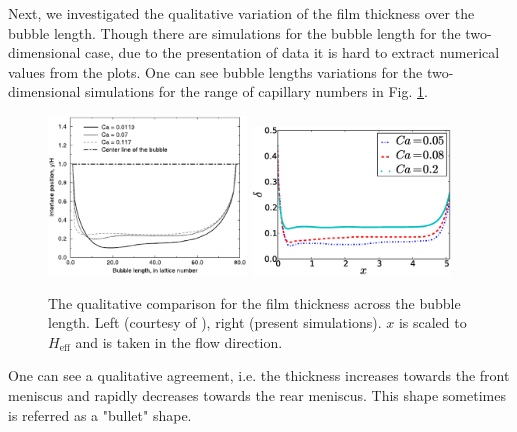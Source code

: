 \documentclass{article}
\begin{document}
Next, we investigated the qualitative variation of the film thickness over the bubble length.
Though there are simulations for the bubble length for the two-dimensional case, due to
the presentation of data it is hard to extract numerical values from the plots. One can see bubble lengths
variations for the two-dimensional simulations for the range of capillary numbers in Fig.
\ref{fig:sehgal:bubble:length}.
\begin{figure}
\includegraphics[width=0.47\textwidth]{Figures/Bubble/bubble_sehgal.eps}\hfill
\includegraphics[width=0.47\textwidth]{Figures/Bubble/bubble_length.eps}\\
\caption{The qualitative comparison for the film thickness across
the bubble length. Left (courtesy of \citet{sehgal-microchannel}),
right (present simulations). $x$ is scaled to $H_{\mathrm{eff}}$
and is taken in the flow direction.\label{fig:sehgal:bubble:length}}
\end{figure}
One can see a qualitative agreement, i.e. the thickness increases towards the front meniscus and
rapidly decreases towards the rear meniscus. This shape sometimes is referred as a "bullet" shape.
\end{document}

